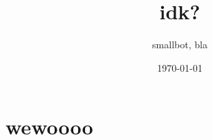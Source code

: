 \documentclass[11pt, twocolumn]{book}
\title{idk?}
\author{smallbot, bla}
\date{\today}
\begin{document}
    \maketitle
    \frontmatter
    \tableofcontents
    \mainmatter
    \chapter[wee]{wewoooo}\label{ch:wewoooo}
\end{document}

